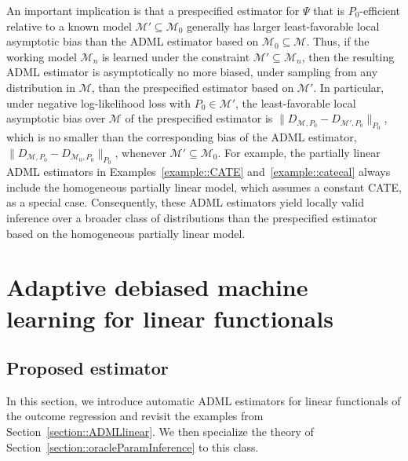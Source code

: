 \documentclass[11pt]{article}
\theoremstyle{definition}
\begin{document}
An important implication is that a prespecified estimator for \(\Psi\) that is \(P_0\)-efficient relative to a known model \(\mathcal{M}' \subseteq \mathcal{M}_0\) generally has larger least-favorable local asymptotic bias than the ADML estimator based on \(\mathcal{M}_0 \subseteq \mathcal{M}\). Thus, if the working model \(\mathcal{M}_n\) is learned under the constraint \(\mathcal{M}' \subseteq \mathcal{M}_n\), then the resulting ADML estimator is asymptotically no more biased, under sampling from any distribution in \(\mathcal{M}\), than the prespecified estimator based on \(\mathcal{M}'\). In particular, under negative log-likelihood loss with \(P_0 \in \mathcal{M}'\), the least-favorable local asymptotic bias over \(\mathcal{M}\) of the prespecified estimator is \(\|D_{\mathcal{M},P_0} - D_{\mathcal{M}',P_0}\|_{P_0}\), which is no smaller than the corresponding bias of the ADML estimator, \(\|D_{\mathcal{M},P_0} - D_{\mathcal{M}_0,P_0}\|_{P_0}\), whenever \(\mathcal{M}' \subseteq \mathcal{M}_0\). For example, the partially linear ADML estimators in Examples~\ref{example::CATE} and~\ref{example::catecal} always include the homogeneous partially linear model, which assumes a constant CATE, as a special case. Consequently, these ADML estimators yield locally valid inference over a broader class of distributions than the prespecified estimator based on the homogeneous partially linear model.
 
\section{Adaptive debiased machine learning for linear functionals}
\label{adml::linearfunc}
\subsection{Proposed estimator}
In this section, we introduce automatic ADML estimators for linear functionals of the outcome regression and revisit the examples from Section~\ref{section::ADMLlinear}. We then specialize the theory of Section~\ref{section::oracleParamInference} to this class.
\end{document}
